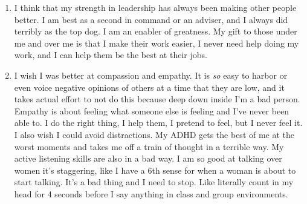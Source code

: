 \documentclass{article}[letterpaper,12pt]
\begin{document}
\begin{enumerate}
\begin{enumerate}[i.]
		\end{enumerate}
	\item I think that my strength in leadership has always been making other people better. I am best as a second in command or an adviser, and I always did terribly as the top dog. I am an enabler of greatness. My gift to those under me and over me is that I make their work easier, I never need help doing my work, and I can help them be the best at their jobs.
	\item I wish I was better at compassion and empathy. It is \emph{so} easy to harbor or even voice negative opinions of others at a time that they are low, and it takes actual effort to not do this because deep down inside I'm a bad person. Empathy is about feeling what someone else is feeling and I've never been able to. I do the right thing, I help them, I pretend to feel, but I never feel it. I also wish I could avoid distractions. My ADHD gets the best of me at the worst moments and takes me off a train of thought in a terrible way. My active listening skills are also in a bad way. I am so good at talking over women it's staggering, like I have a 6th sense for when a woman is about to start talking. It's a bad thing and I need to stop. Like literally count in my head for 4 seconds before I say anything in class and group environments. 
\end{enumerate}
\printbibliography
%
\end{document}
